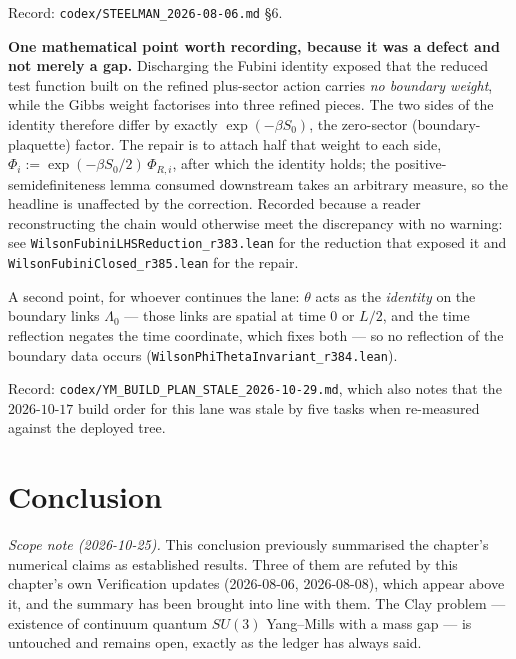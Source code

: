 \noindent Record: \texttt{codex/STEELMAN\_2026-08-06.md} \S6.

\noindent \textbf{One mathematical point worth recording, because it was a
defect and not merely a gap.} Discharging the Fubini identity exposed that the
reduced test function built on the refined plus-sector action carries \emph{no
boundary weight}, while the Gibbs weight factorises into three refined pieces.
The two sides of the identity therefore differ by exactly $\exp(-\beta S_0)$,
the zero-sector (boundary-plaquette) factor. The repair is to attach half that
weight to each side, $\Phi_i := \exp(-\beta S_0/2)\,\Phi_{R,i}$, after which the
identity holds; the positive-semidefiniteness lemma consumed downstream takes an
arbitrary measure, so the headline is unaffected by the correction. Recorded
because a reader reconstructing the chain would otherwise meet the discrepancy
with no warning: see
\texttt{WilsonFubiniLHSReduction\_r383.lean} for the reduction that exposed it
and \texttt{WilsonFubiniClosed\_r385.lean} for the repair.

\noindent A second point, for whoever continues the lane: $\theta$ acts as the
\emph{identity} on the boundary links $\Lambda_0$ --- those links are spatial at
time $0$ or $L/2$, and the time reflection negates the time coordinate, which
fixes both --- so no reflection of the boundary data occurs
(\texttt{WilsonPhiThetaInvariant\_r384.lean}).

\noindent Record: \texttt{codex/YM\_BUILD\_PLAN\_STALE\_2026-10-29.md}, which
also notes that the $2026$-$10$-$17$ build order for this lane was stale by five
tasks when re-measured against the deployed tree.

\section{Conclusion}

\emph{Scope note (2026-10-25).} This conclusion previously summarised the
chapter's numerical claims as established results. Three of them are refuted by
this chapter's own Verification updates (2026-08-06, 2026-08-08), which appear
above it, and the summary has been brought into line with them. The Clay
problem --- existence of continuum quantum $SU(3)$ Yang--Mills with a mass gap
--- is untouched and remains open, exactly as the ledger has always said.

